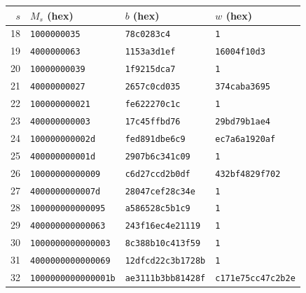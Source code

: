 \documentclass[11pt]{article}
\begin{document}
\begin{center}\small
\begin{tabular}{r|lll}
$s$ & $M_s$ (hex) & $b$ (hex) & $w$ (hex)\\\hline
18 & \texttt{1000000035} & \texttt{78c0283c4} & \texttt{1}\\
19 & \texttt{4000000063} & \texttt{1153a3d1ef} & \texttt{16004f10d3}\\
20 & \texttt{10000000039} & \texttt{1f9215dca7} & \texttt{1}\\
21 & \texttt{40000000027} & \texttt{2657c0cd035} & \texttt{374caba3695}\\
22 & \texttt{100000000021} & \texttt{fe622270c1c} & \texttt{1}\\
23 & \texttt{400000000003} & \texttt{17c45ffbd76} & \texttt{29bd79b1ae4}\\
24 & \texttt{100000000002d} & \texttt{fed891dbe6c9} & \texttt{ec7a6a1920af}\\
25 & \texttt{400000000001d} & \texttt{2907b6c341c09} & \texttt{1}\\
26 & \texttt{10000000000009} & \texttt{c6d27ccd2b0df} & \texttt{432bf4829f702}\\
27 & \texttt{4000000000007d} & \texttt{28047cef28c34e} & \texttt{1}\\
28 & \texttt{100000000000095} & \texttt{a586528c5b1c9} & \texttt{1}\\
29 & \texttt{400000000000063} & \texttt{243f16ec4e21119} & \texttt{1}\\
30 & \texttt{1000000000000003} & \texttt{8c388b10c413f59} & \texttt{1}\\
31 & \texttt{4000000000000069} & \texttt{12dfcd22c3b1728b} & \texttt{1}\\
32 & \texttt{1000000000000001b} & \texttt{ae3111b3bb81428f} & \texttt{c171e75cc47c2b2e}\\
\end{tabular}
\end{center}
\end{document}
